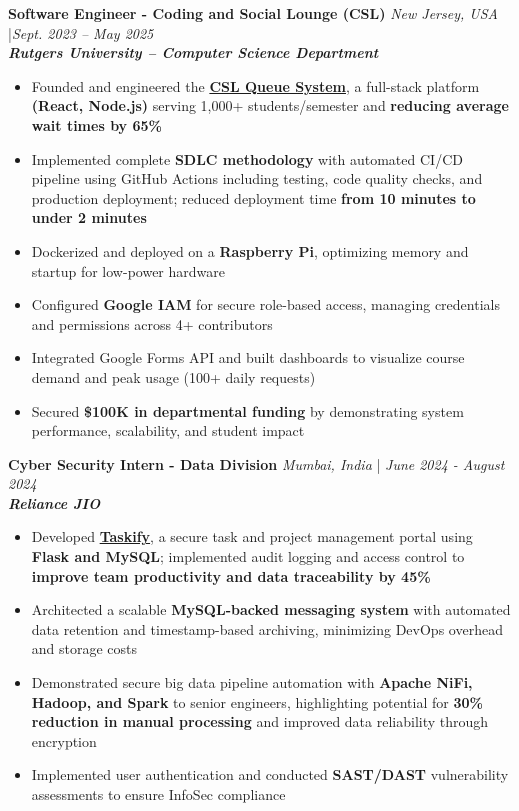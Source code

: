 \documentclass[a4paper]{article}
\begin{document}
\textbf{Software Engineer - Coding and Social Lounge (CSL)} \hfill \textit{New Jersey, USA} |\textit{Sept. 2023 – May 2025} \\
\textit{\textbf{Rutgers University – Computer Science Department}}  
\vspace{-2.5mm}
\begin{itemize} \itemsep -4pt 
    \item Founded and engineered the \textbf{\href{https://drive.google.com/file/d/1x0PIBHbKDmxw2qpGwwiSsk5e5cq8U_7k/view?usp=sharing}{CSL Queue System}}, a full-stack platform \textbf{(React, Node.js)} serving 1,000+ students/semester and \textbf{reducing average wait times by 65\%}
    \item Implemented complete \textbf{SDLC methodology} with automated CI/CD pipeline using GitHub Actions including testing, code quality checks, and production deployment; reduced deployment time \textbf{from 10 minutes to under 2 minutes}
    \item Dockerized and deployed on a \textbf{Raspberry Pi}, optimizing memory and startup for low-power hardware
    \item Configured \textbf{Google IAM} for secure role-based access, managing credentials and permissions across 4+ contributors
    \item Integrated Google Forms API and built dashboards to visualize course demand and peak usage (100+ daily requests)
    \item Secured \textbf{\$100K in departmental funding} by demonstrating system performance, scalability, and student impact
\end{itemize}


\textbf{Cyber Security Intern - Data Division} \hfill  \textit{Mumbai, India} | \textit{June 2024 - August 2024} \\ 
\textit{\textbf{Reliance JIO}}
\vspace{-2.5mm}
\begin{itemize} \itemsep -4pt 
    \item Developed \textbf{\href{https://github.com/ShatakshiRanjan/JIOWebDesign}{Taskify}}, a secure task and project management portal using \textbf{Flask and MySQL}; implemented audit logging and access control to \textbf{improve team productivity and data traceability by 45\%}
    \item Architected a scalable \textbf{MySQL-backed messaging system} with automated data retention and timestamp-based archiving, minimizing DevOps overhead and storage costs
    \item Demonstrated secure big data pipeline automation with \textbf{Apache NiFi, Hadoop, and Spark} to senior engineers, highlighting potential for \textbf{30\% reduction in manual processing} and improved data reliability through encryption
    \item Implemented user authentication and conducted \textbf{SAST/DAST} vulnerability assessments to ensure InfoSec compliance
\end{itemize}
\end{document}
